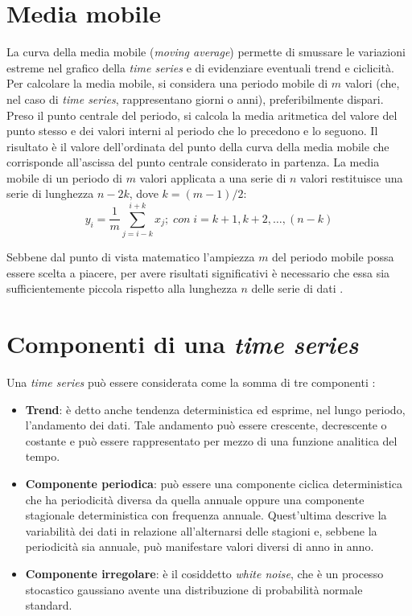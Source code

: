 \section{Media mobile}
\label{sec:MA}
La curva della media mobile (\textit{moving average}) permette di smussare le variazioni estreme nel grafico della \textit{time series} e di evidenziare eventuali trend e ciclicità. Per calcolare la media mobile, si considera una periodo mobile di $m$ valori (che, nel caso di \textit{time series}, rappresentano giorni o anni), preferibilmente dispari. Preso il punto centrale del periodo, si calcola la media aritmetica del valore del punto stesso e dei valori interni al periodo che lo precedono e lo seguono. Il risultato è il valore dell'ordinata del punto della curva della media mobile che corrisponde all'ascissa del punto centrale considerato in partenza.
La media mobile di un periodo di $m$ valori applicata a una serie di $n$ valori restituisce una serie di lunghezza $n-2k$, dove $k=(m-1)/2$:
\begin{equation}
y_{i}=\frac{1}{m}\sum_{j=i-k}^{i+k}x_{j};\;con\;	i=k+1,k+2,\dots,(n-k)
\end{equation}

Sebbene dal punto di vista matematico l'ampiezza $m$ del periodo mobile possa essere scelta a piacere, per avere risultati significativi è necessario che essa sia sufficientemente piccola rispetto alla lunghezza $n$ delle serie di dati \cite{MA}.

\section{Componenti di una \textit{time series}}
\label{sec:componenti}
Una \textit{time series} può essere considerata come la somma di tre componenti \cite{book}:
\begin{itemize}
	\item \textbf{Trend}: è detto anche tendenza deterministica ed esprime, nel lungo periodo, l'andamento dei dati. Tale andamento può essere crescente, decrescente o costante e può essere rappresentato per mezzo di una funzione analitica del tempo.
	\item \textbf{Componente periodica}: può essere una componente ciclica deterministica che ha periodicità diversa da quella annuale oppure una componente stagionale deterministica con frequenza annuale. Quest'ultima descrive la variabilità dei dati in relazione all'alternarsi delle stagioni e, sebbene la periodicità sia annuale, può manifestare valori diversi di anno in anno.
	\item \textbf{Componente irregolare}: è il cosiddetto \textit{white noise}, che è un processo stocastico gaussiano avente una distribuzione di probabilità normale standard.
\end{itemize}


